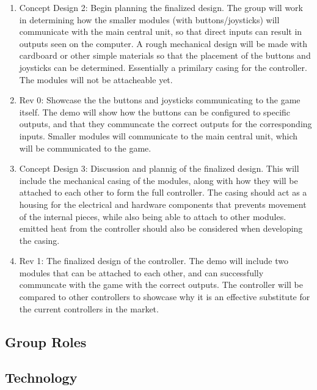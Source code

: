 \documentclass[a4]{article}
\begin{document}
\begin{enumerate}
    \item \textcolor{McMasterMaroon}{Concept Design 2}: Begin planning the finalized design. The group will work in determining how the smaller modules (with buttons/joysticks) will communicate with the main central unit, so that direct inputs can result in outputs seen on the computer. A rough mechanical design will be made with cardboard or other simple materials so that the placement of the buttons and joysticks can be determined. Essentially a primilary casing for the controller. The modules will not be attacheable yet.
    \item \textcolor{McMasterMaroon}{Rev 0}: Showcase the the buttons and joysticks communicating to the game itself. The demo will show how the buttons can be configured to specific outputs, and that they communcate the correct outputs for the corresponding inputs. Smaller modules will communicate to the main central unit, which will be communicated to the game.
    \item \textcolor{McMasterMaroon}{Concept Design 3}: Discussion and plannig of the finalized design. This will include the mechanical casing of the modules, along with how they will be attached to each other to form the full controller. The casing should act as a housing for the electrical and hardware components that prevents movement of the internal pieces, while also being able to attach to other modules. emitted heat from the controller should also be considered when developing the casing.
    \item \textcolor{McMasterMaroon}{Rev 1}: The finalized design of the controller. The demo will include two modules that can be attached to each other, and can successfully communcate with the game with the correct outputs. The controller will be compared to other controllers to showcase why it is an effective substitute for the current controllers in the market. 
\end{enumerate}
\subsection{Group Roles}
\subsection{Technology}
\end{document}
